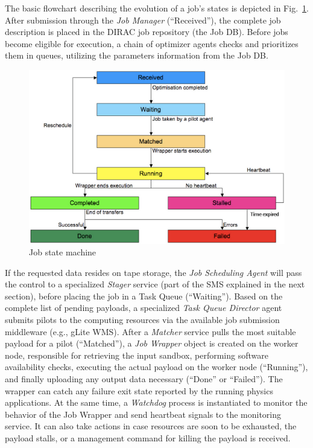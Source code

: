 \documentclass[sort&compress,preprint,3p]{elsarticle}
\begin{document}
 
The basic flowchart describing the evolution of a job's states is depicted in
Fig.~\ref{fig:DIRAC-job-state-machine}. After submission through the \textit{Job Manager} (``Received''), the complete
job description is placed in the DIRAC job repository (the Job DB). Before jobs
become eligible for execution, a chain of optimizer agents checks and prioritizes
them in queues, utilizing the parameters information from the Job DB.
\begin{figure}[tp]
\includegraphics[width=0.7\linewidth,keepaspectratio=true]{./Figure3.png}
\centering
\caption{Job state machine \cite{ProductionShifterGuide}}
\label{fig:DIRAC-job-state-machine}
\end{figure} 
If the requested data resides on tape storage, the \textit{Job
Scheduling Agent} will pass the control to a specialized \textit{Stager} service (part of
the SMS explained in the next section), before placing the job in a Task Queue
(``Waiting''). Based on the complete list of pending payloads, a specialized \textit{Task
Queue Director} agent submits pilots to the computing resources via the available job
submission middleware (e.g., gLite WMS). After
a \textit{Matcher} service pulls the most suitable payload for a pilot (``Matched''), a \textit{Job
Wrapper} object is created on the worker node, responsible for retrieving the
input sandbox, performing software availability checks, executing the actual
payload on the worker node (``Running''), and finally uploading any output data
necessary (``Done'' or ``Failed''). The wrapper can catch any failure exit state
reported by the running physics applications. At the same time, a \textit{Watchdog}
process is instantiated to monitor the behavior of the Job Wrapper and send
heartbeat signals to the monitoring service. It can also take actions in case
resources are soon to be exhausted, the payload stalls, or a management command
for killing the payload is received.
\end{document}
